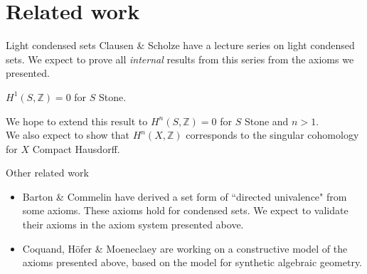 \documentclass{beamer}
\begin{document}
\section{Related work}
\begin{frame}{Light condensed sets}
    Clausen \& Scholze have a lecture series on light condensed sets. 
    \pause
    We expect to prove all \textit{internal} results from this series from the axioms we presented. 
    \pause
    \begin{lemma}
      $H^1(S,\mathbb Z) = 0$ for $S$ Stone.
    \end{lemma}
    \pause
    We hope to extend this result to 
      $H^n(S,\mathbb Z) = 0$ for $S$ Stone and $n>1$.
      \pause
      \\
      We also expect to show that $H^n(X,\mathbb Z)$ corresponds to the singular cohomology for $X$ Compact Hausdorff.
\end{frame}
\begin{frame}{Other related work}
  \begin{itemize}
    \item 
      Barton \& Commelin have derived a set form of ``directed univalence" from some axioms. \pause
      These axioms hold for condensed sets. \pause
      We expect to validate their axioms in the axiom system presented above. 
      \pause
    \item 
    Coquand, H\"ofer \& Moeneclaey are working on a 
    constructive model of the axioms presented above, 
    based on the model for synthetic algebraic geometry. 
\end{itemize}
\end{frame}

\end{document}
